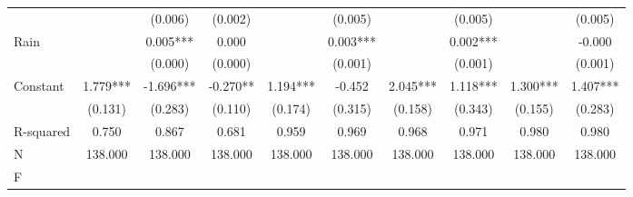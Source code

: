 {\begin{tabular}{l*{9}{c}}
                    &               &     (0.006)   &     (0.002)   &               &     (0.005)   &               &     (0.005)   &               &     (0.005)   \\
Rain                &               &       0.005***&       0.000   &               &       0.003***&               &       0.002***&               &      -0.000   \\
                    &               &     (0.000)   &     (0.000)   &               &     (0.001)   &               &     (0.001)   &               &     (0.001)   \\
Constant            &       1.779***&      -1.696***&      -0.270** &       1.194***&      -0.452   &       2.045***&       1.118***&       1.300***&       1.407***\\
                    &     (0.131)   &     (0.283)   &     (0.110)   &     (0.174)   &     (0.315)   &     (0.158)   &     (0.343)   &     (0.155)   &     (0.283)   \\
\hline
R-squared           &       0.750   &       0.867   &       0.681   &       0.959   &       0.969   &       0.968   &       0.971   &       0.980   &       0.980   \\
N                   &     138.000   &     138.000   &     138.000   &     138.000   &     138.000   &     138.000   &     138.000   &     138.000   &     138.000   \\
F                   &               &               &               &               &               &               &               &               &               \\
\hline\hline
\end{tabular}
}
